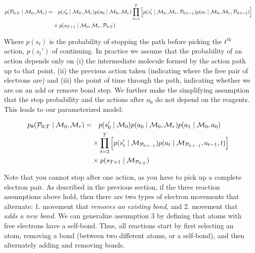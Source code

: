 \begin{align*}
p({\mathcal{P}}_{0:T} \mid {\mathcal{M}}_0, {\mathcal{M}}_r) = &
 \quad 
 p(s_0' \mid {\mathcal{M}}_0, {\mathcal{M}}_r)
 p(a_0 \mid {\mathcal{M}}_0, {\mathcal{M}}_r)
 \prod_{t=1}^{T} \Big[ 
 	p(s_t' \mid {\mathcal{M}}_0, {\mathcal{M}}_r, {\mathcal{P}}_{0:t-1})
 	p(a_t \mid {\mathcal{M}}_0, {\mathcal{M}}_r, {\mathcal{P}}_{0:t-1} ) 
 \Big] \\
 & \times p(s_{T+1} \mid  {\mathcal{M}}_0, {\mathcal{M}}_r, {\mathcal{P}}_{0:T} )
\end{align*}

Where $p(s_{t})$ is the probability of stopping the path before picking the $t^{\text{th}}$ action, $p(s_{t}')$ of continuing.
In practice we assume that the probability of an action depends only on (i) the intermediate molecule formed by the action path up to that point, (ii) the previous action taken (indicating where the free pair of electrons are) and (iii) the point of time through the path, indicating whether we are on an add or remove bond step. 
We further make the simplifying assumption that the stop probability and the actions after $a_0$ do not depend on the reagents. This leads to our parameterized model:

\begin{align*}
p_\theta({\mathcal{P}}_{0:T} \mid {\mathcal{M}}_0, {\mathcal{M}}_r) = &
 \quad p(s_0' \mid {\mathcal{M}}_0) 
       p(a_0 \mid {\mathcal{M}}_0, {\mathcal{M}}_r)
       p(a_1 \mid {\mathcal{M}}_0, a_0) \\
       & \times \prod_{t=2}^{T} \Big[
              p(s_t' \mid {\mathcal{M}}_{{\mathcal{P}}_{0:t-1}}) 
               p(a_t \mid {\mathcal{M}}_{{\mathcal{P}}_{0:t-1}}, a_{t-1}, t)
       \Big] \\
       & \times p(s_{T+1} \mid {\mathcal{M}}_{{\mathcal{P}}_{0:T}})
\end{align*}

Note that you cannot stop after one action, as you have to pick up a complete electron pair.
As described in the previous section, if the three reaction assumptions above hold, then there are two types of electron movements that alternate: 1. movement that \emph{removes an existing bond}, and 2. movement that \emph{adds a new bond}. We can generalize assumption 3 by defining that atoms with free electrons have a self-bond. Thus, all reactions start by first selecting an atom, removing a bond (between two different atoms, or a self-bond), and then alternately adding and removing bonds. 

